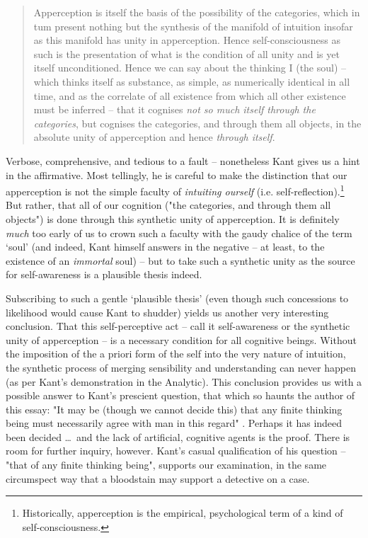 \begin{quote}
  Apperception is itself the basis of the possibility of the categories, which in tum present nothing but the synthesis of the manifold of intuition insofar as this manifold has unity in apperception. Hence self-consciousness as such is the presentation of what is the condition of all unity and is yet itself unconditioned. Hence we can say about the thinking I (the soul) -- which thinks itself as substance, as simple, as numerically identical in all time, and as the correlate of all existence from which all other existence must be inferred -- that it cognises \emph{not so much itself through the categories}, but cognises the categories, and through them all objects, in the absolute unity of apperception and hence \emph{through itself}.

  \autocite[A399]{hackett}
\end{quote}

\noindent
Verbose, comprehensive, and tedious to a fault -- nonetheless Kant gives us a hint in the affirmative. Most tellingly, he is careful to make the distinction that our apperception is not the simple faculty of \emph{intuiting ourself} (i.e. self-reflection).\footnote{Historically, apperception is the empirical, psychological term of a kind of self-consciousness.} But rather, that all of our cognition ("the categories, and through them all objects") is done through this synthetic unity of apperception. It is definitely \emph{much} too early of us to crown such a faculty with the gaudy chalice of the term `soul' (and indeed, Kant himself answers in the negative -- at least, to the existence of an \emph{immortal} soul) -- but to take such a synthetic unity as the source for self-awareness is a plausible thesis indeed.

Subscribing to such a gentle `plausible thesis' (even though such concessions to likelihood would cause Kant to shudder) yields us another very interesting conclusion. That this self-perceptive act -- call it self-awareness or the synthetic unity of apperception -- is a necessary condition for all cognitive beings. Without the imposition of the a priori form of the self into the very nature of intuition, the synthetic process of merging sensibility and understanding can never happen (as per Kant's demonstration in the Analytic). This conclusion provides us with a possible answer to Kant's prescient question, that which so haunts the author of this essay: "It may be (though we cannot decide this) that any finite thinking being must necessarily agree with man in this regard" \autocite[B72]{hackett}. Perhaps it has indeed been decided \ldots\ and the lack of artificial, cognitive agents is the proof. There is room for further inquiry, however. Kant's casual qualification of his question -- "that of any finite thinking being", supports our examination, in the same circumspect way that a bloodstain may support a detective on a case.


